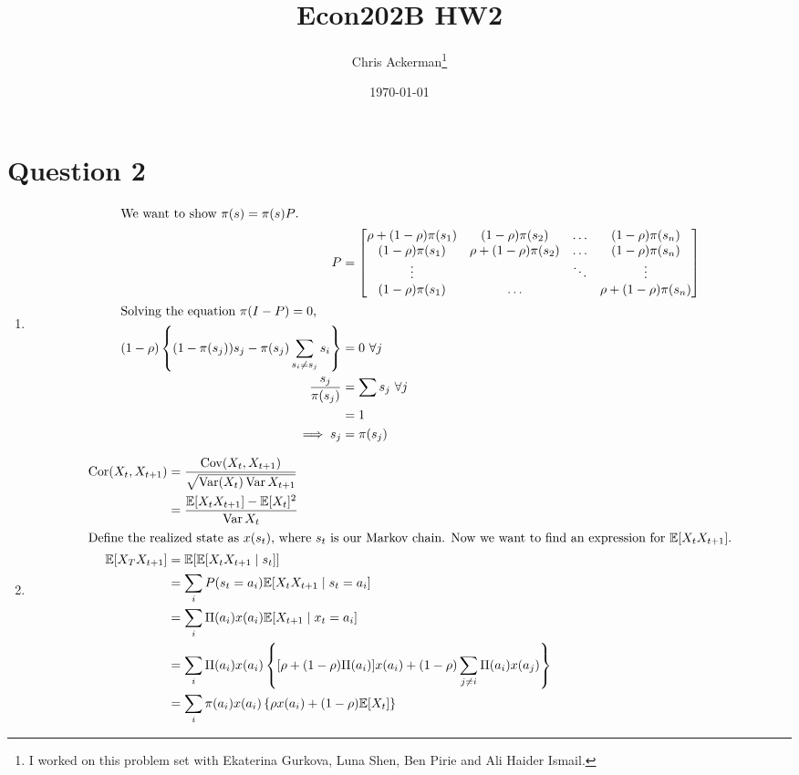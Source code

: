 \documentclass[11pt]{article}
\author{Chris Ackerman\thanks{I worked on this problem set with Ekaterina Gurkova, Luna Shen, Ben Pirie and Ali Haider Ismail.}}
\date{\today}
\title{Econ202B HW2}
\newcommand{\E}{\mathbb{E}}
\newcommand{\var}{\operatorname{Var}}
\newcommand{\cov}{\operatorname{Cov}}
\newcommand{\cor}{\operatorname{Cor}}
\begin{document}
\maketitle
\tableofcontents

\newpage

\section{Question 2}
\label{sec:orgcf89e3e}
  \begin{enumerate}[label=\alph*)]
\item 
\begin{align*}
\intertext{We want to show $\pi (s) = \pi (s) P$.}
P &= \begin{bmatrix}
\rho + (1 - \rho)\pi (s_1) & (1 - \rho)\pi (s_2) & \ldots & (1 - \rho) \pi (s_n)\\
(1 - \rho)\pi (s_1) & \rho + (1 - \rho)\pi(s_2) & \ldots & (1 - \rho)\pi(s_n)\\
\vdots & & \ddots & \vdots \\
(1 - \rho)\pi(s_1) & \ldots & & \rho + (1 - \rho) \pi (s_n)
\end{bmatrix}\\
\intertext{Solving the equation $\pi (I - P) = 0$,}
(1 - \rho) \left\{(1 - \pi(s_j))s_j - \pi (s_j) \sum_{s_i \ne s_j} s_i\right\} &= 0 \ \forall j\\
\frac{s_j}{\pi(s_j)} &= \sum s_j \ \forall j\\
&= 1 \\
\implies s_j &= \pi (s_j)
\end{align*}
\item
\begin{align*}
\cor(X_t, X_{t + 1}) &= \frac{\cov(X_t, X_{t + 1})}{\sqrt{\var(X_t)\var{X_{t + 1}}}}\\
&= \frac{\E[X_t X_{t + 1}] - \E[X_t]^2}{\var{X_t}}\\
\intertext{Define the realized state as $x(s_t)$, where $s_t$ is our Markov chain. Now we want to find an expression for $\E[X_t X_{t + 1}]$.}
\E[X_T X_{t + 1}] &= \E[\E[X_t X_{t + 1}\mid s_t]]\\
&= \sum_i P(s_t = a_i)\E[X_t X_{t + 1} \mid s_t = a_i]\\
&= \sum_i \Pi(a_i)x(a_i)\E[X_{t + 1}\mid x_t = a_i]\\
&= \sum_i \Pi(a_i) x(a_i) \left\{[\rho + (1 - \rho) \Pi(a_i)]x(a_i) + (1 - \rho)\sum_{j \ne i} \Pi(a_i)x(a_j)\right\}\\
&= \sum_i \pi(a_i) x(a_i) \left\{\rho x(a_i) + (1 - \rho) \E[X_t]\right\}\\

\end{align*}
\end{enumerate}
\end{document}

